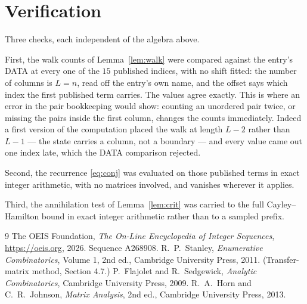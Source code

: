 \documentclass[11pt,a4paper]{article}
\theoremstyle{plain}
\theoremstyle{definition}
\begin{document}
\section{Verification}

Three checks, each independent of the algebra above.

First, the walk counts of Lemma~\ref{lem:walk} were compared against the entry's DATA at
every one of the $15$ published indices, with no shift fitted: the number of columns is
$L=n$, read off the entry's own name, and the offset says which index the first
published term carries. The values agree exactly. This is where an error in the pair
bookkeeping would show: counting an unordered pair twice, or missing the pairs inside the
first column, changes the counts immediately. Indeed a first version of the computation
placed the walk at length $L-2$ rather than $L-1$ --- the state carries a column, not a
boundary --- and every value came out one index late, which the DATA comparison rejected.

Second, the recurrence \eqref{eq:conj} was evaluated on those published terms in exact
integer arithmetic, with no matrices involved, and vanishes wherever it applies.

Third, the annihilation test of Lemma~\ref{lem:crit} was carried to the full
Cayley--Hamilton bound in exact integer arithmetic rather than to a sampled prefix.

\begin{thebibliography}{9}
 The OEIS Foundation, \emph{The On-Line Encyclopedia of Integer
Sequences}, \url{https://oeis.org}, 2026. Sequence A268908.
 R.~P.~Stanley, \emph{Enumerative Combinatorics}, Volume 1, 2nd ed.,
Cambridge University Press, 2011. (Transfer-matrix method, Section 4.7.)
 P.~Flajolet and R.~Sedgewick, \emph{Analytic Combinatorics}, Cambridge
University Press, 2009.
 R.~A.~Horn and C.~R.~Johnson, \emph{Matrix Analysis}, 2nd ed., Cambridge
University Press, 2013.
\end{thebibliography}
\end{document}
